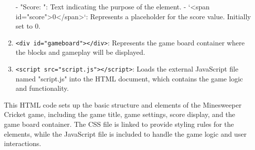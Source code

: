 \documentclass{article}
\begin{document}
\begin{enumerate}
   - "Score: ": Text indicating the purpose of the element.
   - `<span id="score">0</span>`: Represents a placeholder for the score value. Initially set to 0.

\item  \texttt{<div id="gameboard"></div>}: Represents the game board container where the blocks and gameplay will be displayed.

\item  \texttt{<script src="script.js"></script>}: Loads the external JavaScript file named "script.js" into the HTML document, which contains the game logic and functionality.
\end{enumerate}
This HTML code sets up the basic structure and elements of the Minesweeper Cricket game, including the game title, game settings, score display, and the game board container. The CSS file is linked to provide styling rules for the elements, while the JavaScript file is included to handle the game logic and user interactions.
\end{document}
